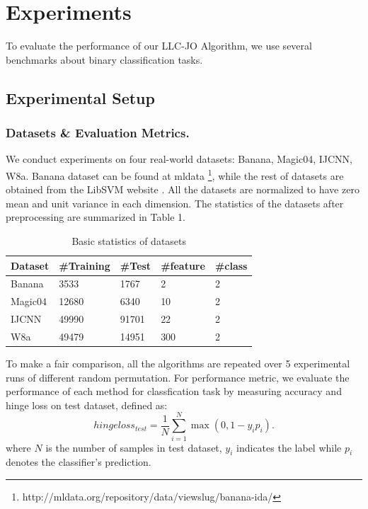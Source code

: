 \documentclass{llncs}
\begin{document}
	\section{Experiments}
	To evaluate the performance of our LLC-JO Algorithm, we use several benchmarks about binary classification tasks.
	\subsection{Experimental Setup}
	\subsubsection{Datasets \& Evaluation Metrics.}
	We conduct experiments on four real-world datasets: Banana, Magic04, IJCNN, W8a. Banana dataset can be found at mldata \footnote{http://mldata.org/repository/data/viewslug/banana-ida/}, while the rest of datasets are obtained from the LibSVM website \cite{15}.  All the datasets are normalized to have zero mean and unit variance in each dimension. The statistics of the datasets after preprocessing are summarized in Table 1.
	\begin{table}
		\centering
		\begin{tabu} to \textwidth {|X[c]| X[c]| X[c]| X[c]| X[c]|}
			\hline
			Dataset              & \#Training & \#Test & \#feature &\#class\\
			\hline
			Banana 		   	& 3533 & 1767 & 2 & 2  \\
			Magic04     	& 12680 & 6340 & 10 & 2  \\
			IJCNN           	& 49990 & 91701 & 22 & 2  \\
			W8a           	& 49479 & 14951 & 300 & 2  \\
			\hline
		\end{tabu}
		\caption{Basic statistics of datasets}
	\end{table}
	To make a fair comparison, all the algorithms are repeated over 5 experimental runs of different random permutation. For performance metric, we evaluate the performance of each method for classfication task by measuring accuracy and hinge loss on test dataset, defined as:
	\begin{equation*}
	hingeloss_{test} = \frac{1}{N}\sum_{i=1}^N\max(0,1-y_ip_i).
	\end{equation*}
	where $N$ is the number of samples in test dataset, $y_i$ indicates the label while $p_i$ denotes the classifier's prediction.
\end{document}
